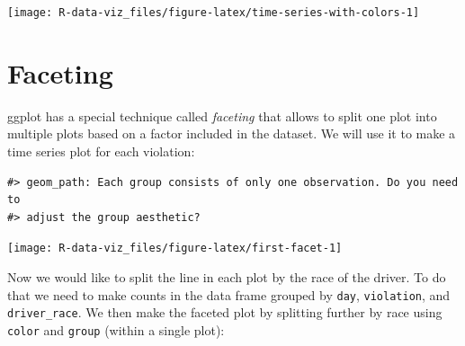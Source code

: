 \documentclass[]{book}
\newenvironment{Shaded}{\begin{snugshade}}{\end{snugshade}}
\newcommand{\KeywordTok}[1]{\textcolor[rgb]{0.13,0.29,0.53}{\textbf{#1}}}
\newcommand{\DataTypeTok}[1]{\textcolor[rgb]{0.13,0.29,0.53}{#1}}
\newcommand{\StringTok}[1]{\textcolor[rgb]{0.31,0.60,0.02}{#1}}
\newcommand{\OtherTok}[1]{\textcolor[rgb]{0.56,0.35,0.01}{#1}}
\newcommand{\OperatorTok}[1]{\textcolor[rgb]{0.81,0.36,0.00}{\textbf{#1}}}
\newcommand{\NormalTok}[1]{#1}
\theoremstyle{definition}
\theoremstyle{definition}
\theoremstyle{definition}
\theoremstyle{remark}
\begin{document}
\texttt{[image: R-data-viz\_files/figure-latex/time-series-with-colors-1]}

\section{Faceting}\label{faceting}

ggplot has a special technique called \emph{faceting} that allows to
split one plot into multiple plots based on a factor included in the
dataset. We will use it to make a time series plot for each violation:

\begin{Shaded}
\end{Shaded}

\begin{verbatim}
#> geom_path: Each group consists of only one observation. Do you need to
#> adjust the group aesthetic?
\end{verbatim}

\texttt{[image: R-data-viz\_files/figure-latex/first-facet-1]}

Now we would like to split the line in each plot by the race of the
driver. To do that we need to make counts in the data frame grouped by
\texttt{day}, \texttt{violation}, and \texttt{driver\_race}. We then
make the faceted plot by splitting further by race using \texttt{color}
and \texttt{group} (within a single plot):
\end{document}
